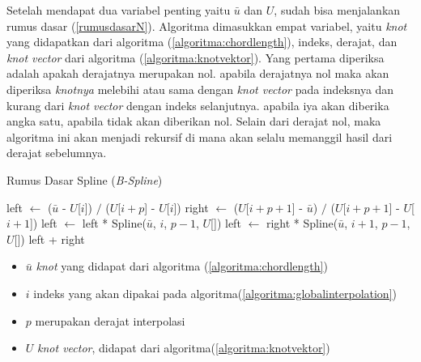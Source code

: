 Setelah mendapat dua variabel penting yaitu $\bar{u}$
dan $U$, sudah bisa menjalankan rumus dasar (\ref*{rumusdasarN}).
Algoritma dimasukkan empat variabel, yaitu \textit{knot} yang didapatkan
dari algoritma (\ref{algoritma:chordlength}), indeks, derajat, dan
\textit{knot vector} dari algoritma (\ref{algoritma:knotvektor}).
Yang pertama diperiksa adalah apakah derajatnya merupakan nol.
apabila derajatnya nol maka akan diperiksa \textit{knotnya} melebihi 
atau sama dengan \textit{knot vector} pada indeksnya dan kurang 
dari \textit{knot vector} dengan indeks selanjutnya. apabila
iya akan diberika angka satu, apabila tidak akan diberikan nol.
Selain dari derajat nol, maka algoritma ini akan menjadi rekursif
di mana akan selalu memanggil hasil dari derajat sebelumnya.
\begin{algorithm}[H]
  \caption{Rumus Dasar Spline (\textit{B-Spline})}
  \begin{algorithmic}[1]
        \State {}
      \Else
        \State {}
      \EndIf
    \Else {}
      \State left $\gets$ ($\bar{u}$ - $U$[$i$]) $/$ ($U$[$i+p$] - $U$[$i$])
      \State right $\gets$ ($U$[$i+p+1$] - $\bar{u}$) $/$ ($U$[$i+p+1$] - $U$[$i+1$])
      \State left $\gets$ left * Spline($\bar{u}$, $i$, $p-1$, $U$[\;]) 
      \State left $\gets$ right * Spline($\bar{u}$, $i+1$, $p-1$, $U$[\;])
      \State \Return left + right
    \EndIf
  \EndFunction
  \end{algorithmic}
  \label{algoritma:spline}
\end{algorithm}
\begin{itemize}
  \setlength{\itemsep}{0pt}
  \setlength{\parskip}{0pt}
  \setlength{\parsep}{0pt}
  \item $\bar{u}$ \textit{knot} yang didapat dari 
  algoritma (\ref{algoritma:chordlength})
  \item $i$ indeks yang akan dipakai pada algoritma(\ref{algoritma:globalinterpolation})
  \item $p$ merupakan derajat interpolasi
  \item $U$ \textit{knot vector}, didapat dari algoritma(\ref{algoritma:knotvektor})
\end{itemize}

